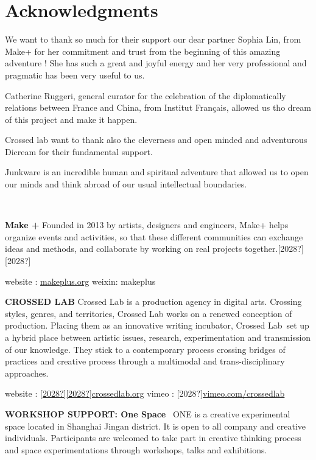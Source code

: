 \section{Acknowledgments}

We want to thank so much for their support our dear partner Sophia Lin,
from Make+ for her commitment and trust from the beginning of this
amazing adventure ! She has such a great and joyful energy and her very
professional and pragmatic has been very useful to us.

Catherine Ruggeri, general curator for the celebration of the
diplomatically relations between France and China, from Institut
Fran\c{c}ais, allowed us tho dream of this project and make it happen.~

Crossed lab want to thank also the cleverness and open minded and
adventurous Dicream for their fundamental support.

Junkware is an incredible human and spiritual adventure that allowed us
to open our minds and think abroad of our usual intellectual
boundaries.

~

\textbf{Make +\newline
}Founded in 2013 by artists, designers and engineers, Make+ helps
organize events and activities, so that these different communities can
exchange ideas and methods, and collaborate by working on real projects
together.[2028?][2028?]

website : \href{http://makeplus.org/}{makeplus.org}\newline
weixin: makeplus\newline
~

\textbf{CROSSED LAB\newline
}Crossed Lab is a production agency in digital arts. Crossing styles,
genres, and territories, Crossed Lab works on a renewed conception of
production. Placing them as an innovative writing incubator, Crossed
Lab~set up a hybrid place between artistic issues, research,
experimentation and transmission of our knowledge. They stick to a
contemporary process crossing bridges of practices and creative process
through a multimodal and trans-disciplinary approaches.

website :
\href{http://www.crossedlab.org/}{[2028?][2028?]crossedlab.org}\newline
vimeo :
[2028?]\href{http://vimeo.com/crossedlab}{vimeo.com/crossedlab}\newline
~

\textbf{WORKSHOP SUPPORT: One Space}~\newline
ONE is a creative experimental space located in Shanghai Jingan
district. It is open to all company and creative individuals.
Participants are welcomed to take part in creative thinking process and
space experimentations through workshops, talks and exhibitions.~

